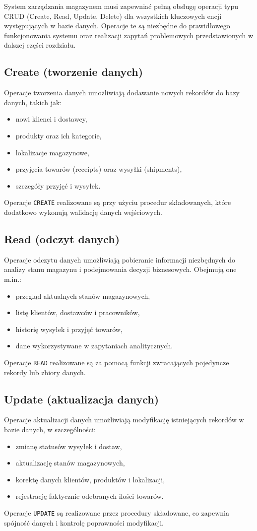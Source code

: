 System zarządzania magazynem musi zapewniać pełną obsługę operacji
typu CRUD (Create, Read, Update, Delete) dla wszystkich kluczowych
encji występujących w bazie danych. Operacje te są niezbędne do
prawidłowego funkcjonowania systemu oraz realizacji zapytań
problemowych przedstawionych w dalszej części rozdziału.

\subsection*{Create (tworzenie danych)}
Operacje tworzenia danych umożliwiają dodawanie nowych rekordów
do bazy danych, takich jak:
\begin{itemize}
    \item nowi klienci i dostawcy,
    \item produkty oraz ich kategorie,
    \item lokalizacje magazynowe,
    \item przyjęcia towarów (receipts) oraz wysyłki (shipments),
    \item szczegóły przyjęć i wysyłek.
\end{itemize}
Operacje \texttt{CREATE} realizowane są przy użyciu procedur
składowanych, które dodatkowo wykonują walidację danych wejściowych.

\subsection*{Read (odczyt danych)}
Operacje odczytu danych umożliwiają pobieranie informacji
niezbędnych do analizy stanu magazynu i podejmowania decyzji
biznesowych. Obejmują one m.in.:
\begin{itemize}
    \item przegląd aktualnych stanów magazynowych,
    \item listę klientów, dostawców i pracowników,
    \item historię wysyłek i przyjęć towarów,
    \item dane wykorzystywane w zapytaniach analitycznych.
\end{itemize}
Operacje \texttt{READ} realizowane są za pomocą funkcji zwracających
pojedyncze rekordy lub zbiory danych.

\subsection*{Update (aktualizacja danych)}
Operacje aktualizacji danych umożliwiają modyfikację istniejących
rekordów w bazie danych, w szczególności:
\begin{itemize}
    \item zmianę statusów wysyłek i dostaw,
    \item aktualizację stanów magazynowych,
    \item korektę danych klientów, produktów i lokalizacji,
    \item rejestrację faktycznie odebranych ilości towarów.
\end{itemize}
Operacje \texttt{UPDATE} są realizowane przez procedury składowane,
co zapewnia spójność danych i kontrolę poprawności modyfikacji.

